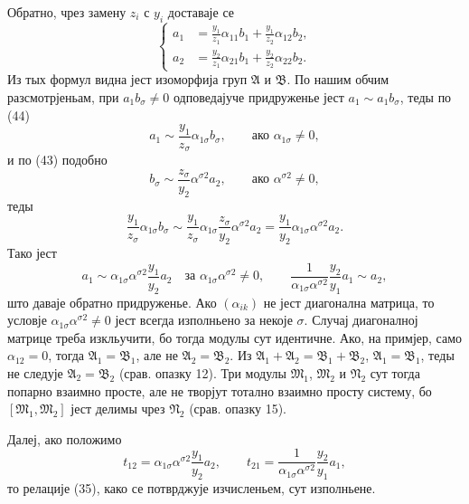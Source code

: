 ﻿\documentclass[11pt]{article}
\begin{document}
Обратно, чрез замену \(z_i\) с \(y_i\) доставаје се
\begin{equation}
\left\{
\begin{aligned}
 a_1&=\frac{y_1}{z_1}\alpha_{11}b_1+\frac{y_1}{z_2}\alpha_{12}b_2,\\
 a_2&=\frac{y_2}{z_1}\alpha_{21}b_1+\frac{y_2}{z_2}\alpha_{22}b_2.
\end{aligned}\right.
\tag{44}
\end{equation}
Из тых формул видна јест изоморфија груп \(\mathfrak A\) и \(\mathfrak B\). По нашим обчим разсмотрјеньам, при \(a_1b_\sigma\ne0\) одповедајуче придруженье јест \(a_1\sim a_1b_\sigma\), теды по (44)
\[
 a_1\sim\frac{y_1}{z_\sigma}\alpha_{1\sigma}b_\sigma,
 \qquad\text{ако }\alpha_{1\sigma}\ne0,
\]
и по (43) подобно
\[
 b_\sigma\sim\frac{z_\sigma}{y_2}\alpha^{\sigma2}a_2,
 \qquad\text{ако }\alpha^{\sigma2}\ne0,
\]
теды
\[
 \frac{y_1}{z_\sigma}\alpha_{1\sigma}b_\sigma
 \sim
 \frac{y_1}{z_\sigma}\alpha_{1\sigma}\frac{z_\sigma}{y_2}\alpha^{\sigma2}a_2
 =\frac{y_1}{y_2}\alpha_{1\sigma}\alpha^{\sigma2}a_2.
\]
Тако јест
\[
 a_1\sim\alpha_{1\sigma}\alpha^{\sigma2}\frac{y_1}{y_2}a_2
 \quad\text{за }\alpha_{1\sigma}\alpha^{\sigma2}\ne0,
 \qquad
 \frac{1}{\alpha_{1\sigma}\alpha^{\sigma2}}\frac{y_2}{y_1}a_1\sim a_2,
\]
што даваје обратно придруженье. Ако \((\alpha_{ik})\) не јест диагонална матрица, то условје \(\alpha_{1\sigma}\alpha^{\sigma2}\ne0\) јест всегда изполньено за некоје \(\sigma\). Случај диагоналној матрице треба изкльучити, бо тогда модулы сут идентичне. Ако, на примјер, само \(\alpha_{12}=0\), тогда \(\mathfrak A_1=\mathfrak B_1\), але не \(\mathfrak A_2=\mathfrak B_2\). Из \(\mathfrak A_1+\mathfrak A_2=\mathfrak B_1+\mathfrak B_2\), \(\mathfrak A_1=\mathfrak B_1\), теды не следује \(\mathfrak A_2=\mathfrak B_2\) (срав. опазку 12). Три модулы \(\mathfrak M_1\), \(\mathfrak M_2\) и \(\mathfrak N_2\) сут тогда попарно взаимно просте, але не творјут тотално взаимно просту систему, бо \([\mathfrak M_1,
\mathfrak M_2]\) јест делимы чрез \(\mathfrak N_2\) (срав. опазку 15).

Далеј, ако положимо
\[
 t_{12}=\alpha_{1\sigma}\alpha^{\sigma2}\frac{y_1}{y_2}a_2,
 \qquad
 t_{21}=\frac{1}{\alpha_{1\sigma}\alpha^{\sigma2}}\frac{y_2}{y_1}a_1,
\]
то релације (35), како се потврджује изчисленьем, сут изполньене.
\end{document}
